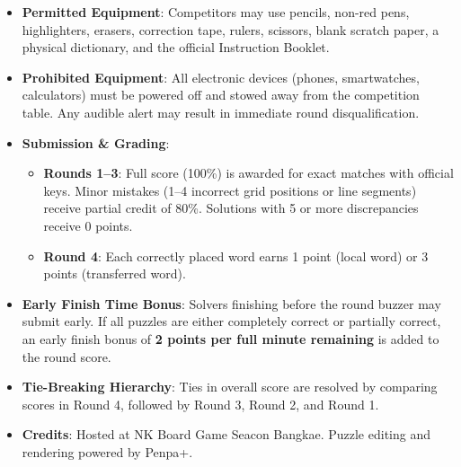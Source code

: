 \documentclass[a4paper, openany, 11pt, twoside]{book}
\begin{document}
\begin{itemize}
    \item \textbf{Permitted Equipment}: Competitors may use pencils, non-red pens, highlighters, erasers, correction tape, rulers, scissors, blank scratch paper, a physical dictionary, and the official Instruction Booklet.
    \item \textbf{Prohibited Equipment}: All electronic devices (phones, smartwatches, calculators) must be powered off and stowed away from the competition table. Any audible alert may result in immediate round disqualification.
    \item \textbf{Submission \& Grading}:
    \begin{itemize}
        \item \textbf{Rounds 1--3}: Full score (100\%) is awarded for exact matches with official keys. Minor mistakes (1--4 incorrect grid positions or line segments) receive partial credit of 80\%. Solutions with 5 or more discrepancies receive 0 points.
        \item \textbf{Round 4}: Each correctly placed word earns 1 point (local word) or 3 points (transferred word).
    \end{itemize}
    \item \textbf{Early Finish Time Bonus}: Solvers finishing before the round buzzer may submit early. If all puzzles are either completely correct or partially correct, an early finish bonus of \textbf{2 points per full minute remaining} is added to the round score.
    \item \textbf{Tie-Breaking Hierarchy}: Ties in overall score are resolved by comparing scores in Round 4, followed by Round 3, Round 2, and Round 1.
    \item \textbf{Credits}: Hosted at NK Board Game Seacon Bangkae. Puzzle editing and rendering powered by Penpa+.
\end{itemize}

\newpage

\mainmatter
\pagestyle{fancy}








\backmatter
\end{document}
